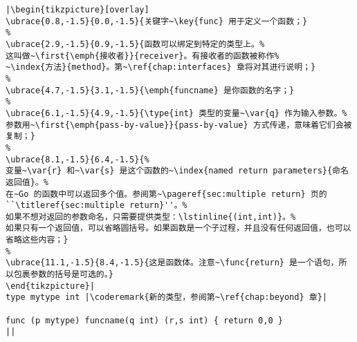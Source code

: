 \begin{lstlisting}[caption=函数定义,label=src:function definition]
|\begin{tikzpicture}[overlay]
\ubrace{0.8,-1.5}{0.0,-1.5}{关键字~\key{func} 用于定义一个函数；}
%
\ubrace{2.9,-1.5}{0.9,-1.5}{函数可以绑定到特定的类型上。%
这叫做~\first{\emph{接收者}}{receiver}。有接收者的函数被称作%
~\index{方法}{method}。第~\ref{chap:interfaces} 章将对其进行说明；}
%
\ubrace{4.7,-1.5}{3.1,-1.5}{\emph{funcname} 是你函数的名字；}
%
\ubrace{6.1,-1.5}{4.9,-1.5}{\type{int} 类型的变量~\var{q} 作为输入参数。%
参数用~\first{\emph{pass-by-value}}{pass-by-value} 方式传递，意味着它们会被复制；}
%
\ubrace{8.1,-1.5}{6.4,-1.5}{%
变量~\var{r} 和~\var{s} 是这个函数的~\index{named return parameters}{命名返回值}。%
在~Go 的函数中可以返回多个值。参阅第~\pageref{sec:multiple return} 页的``\titleref{sec:multiple return}''。%
如果不想对返回的参数命名，只需要提供类型：\lstinline{(int,int)}。%
如果只有一个返回值，可以省略圆括号。如果函数是一个子过程，并且没有任何返回值，也可以省略这些内容；}
%
\ubrace{11.1,-1.5}{8.4,-1.5}{这是函数体。注意~\func{return} 是一个语句，所以包裹参数的括号是可选的。}
\end{tikzpicture}|
type mytype int	|\coderemark{新的类型，参阅第~\ref{chap:beyond} 章}|

func (p mytype) funcname(q int) (r,s int) { return 0,0 }
||
\end{lstlisting}
